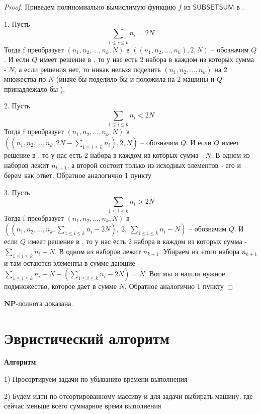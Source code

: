 \documentclass{article}
\begin{document}
\begin{proof}
Приведем полиномиально вычислимую функцию $f$ из $\textsf{SUBSETSUM}$ в \MultiprocessorScheduling.

1. Пусть $$\sum_{1 \leq i \leq k}{n_i} = 2N$$ Тогда f преобразует $(n_1, n_2, ..., n_k, N)$ в $((n_1, n_2, ..., n_k), 2, N)$ -- обозначим $Q$. И если $Q$ имеет решение в \MultiprocessorScheduling, то у нас есть 2 набора в каждом из которых сумма - $N$, а если решения \MultiprocessorScheduling нет, то никак нельзя поделить $(n_1, n_2, ..., n_k)$ на 2 множества по $N$ (иначе бы \MultiprocessorScheduling поделило бы и положила на 2 машины и $Q$ принадлежало бы \MultiprocessorScheduling).

2. Пусть $$\sum_{1 \leq i \leq k}{n_i} < 2N$$ Тогда f преобразует $(n_1, n_2, ..., n_k, N)$ в $\left(\left(n_1, n_2, ..., n_k, 2N - \sum_{1 \leq i \leq k}{n_i}\right), 2, N\right)$ -- обозначим $Q$. И если $Q$ имеет решение в \MultiprocessorScheduling, то у нас есть 2 набора в каждом из которых сумма - $N$. В одном из наборов лежит $n_{k+1}$, а второй состоит только из исходных элементов - его и берем как ответ. Обратное аналогично 1 пункту

3. Пусть $$\sum_{1 \leq i \leq k}{n_i} > 2N$$ Тогда f преобразует $(n_1, n_2, ..., n_k, N)$ в $\left(\left(n_1, n_2, ..., n_k, \sum_{1 \leq i \leq k}{n_i} - 2N\right),\ 2,\ \sum_{1 \leq i \leq k}{n_i} - N\right)$ -- обозначим $Q$. И если $Q$ имеет решение в \MultiprocessorScheduling, то у нас есть 2 набора в каждом из которых сумма - $\sum_{1 \leq i \leq k}{n_i} - N$. В одном из наборов лежит $n_{k+1}$. Убираем из этого набора $n_{k+1}$ и там остаются элементы в сумме дающие $\sum_{1 \leq i \leq k}{n_i} - N - \left(\sum_{1 \leq i \leq k}{n_i} - 2N\right) = N$. Вот мы и нашли нужное подмножество, которое дает в сумме $N$. Обратное аналогично 1 пункту

\end{proof}

\textbf{NP}-полнота доказана.

\section*{Эвристический алгоритм}

\textbf{Алгоритм}

1) Просортируем задачи по убыванию времени выполнения

2) Будем идти по отсортированному массиву и для задачи выбирать машину, где сейчас меньше всего суммарное время выполнения 
\end{document}
